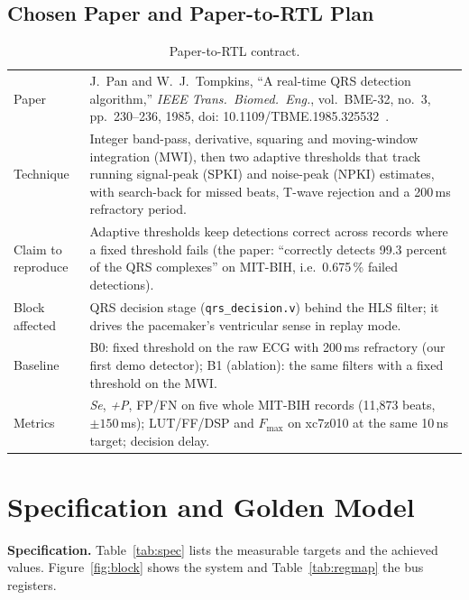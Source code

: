 \documentclass[11pt,a4paper]{article}
\newcommand{\Se}{\textit{Se}}
\newcommand{\Pp}{\textit{+P}}
\begin{document}
\subsection{Chosen Paper and Paper-to-RTL Plan}
\begin{table}[H]\centering\small
\caption{Paper-to-RTL contract.}\label{tab:contract}
\begin{tabularx}{\linewidth}{@{}lX@{}}
\toprule
Paper & J.~Pan and W.~J.~Tompkins, ``A real-time QRS detection algorithm,'' \emph{IEEE Trans.~Biomed.~Eng.}, vol.~BME-32, no.~3, pp.~230--236, 1985, doi: 10.1109/TBME.1985.325532~\cite{pan}.\\
Technique & Integer band-pass, derivative, squaring and moving-window integration (MWI), then two
adaptive thresholds that track running signal-peak (SPKI) and noise-peak (NPKI) estimates, with
search-back for missed beats, T-wave rejection and a 200\,ms refractory period.\\
Claim to reproduce & Adaptive thresholds keep detections correct across records where a fixed threshold fails
(the paper: ``correctly detects 99.3 percent of the QRS complexes'' on MIT-BIH, i.e.\ 0.675\,\%
failed detections).\\
Block affected & QRS decision stage (\texttt{qrs\_decision.v}) behind the HLS filter; it drives the
pacemaker's ventricular sense in replay mode.\\
Baseline & B0: fixed threshold on the raw ECG with 200\,ms refractory (our first demo detector);
B1 (ablation): the same filters with a fixed threshold on the MWI.\\
Metrics & \Se, \Pp, FP/FN on five whole MIT-BIH records (11{,}873 beats, $\pm150$\,ms); LUT/FF/DSP
and $F_\text{max}$ on xc7z010 at the same 10\,ns target; decision delay.\\
\bottomrule
\end{tabularx}
\end{table}

\section{Specification and Golden Model}
\label{sec:spec}
\textbf{Specification.} Table~\ref{tab:spec} lists the measurable targets and the achieved values.
Figure~\ref{fig:block} shows the system and Table~\ref{tab:regmap} the bus registers.
\end{document}
